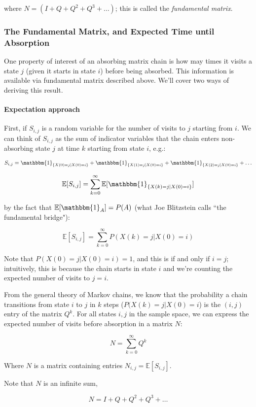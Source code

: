 \documentclass[11pt]{article}
\newcommand{\E}{\mathbb{E}}
\begin{document}
where $N = (I + Q + Q^2 + Q^3 + \ldots)$; this is called the \emph{fundamental
matrix}.


\subsubsection{The Fundamental Matrix, and Expected Time until Absorption}

One property of interest of an absorbing matrix chain is how may times it
visits a state $j$ (given it starts in state $i$) before being absorbed. This
information is available via fundamental matrix described above. We'll cover
two ways of deriving this result.

\paragraph{Expectation approach} First, if $S_{i,j}$ is a random variable for the number of visits to $j$
starting from $i$. We can think of $S_{i,j}$ as the sum of indicator variables
that the chain enters non-absorbing state $j$ at time $k$ starting from state
$i$, e.g.:

$$
S_{i,j} = \mathbbm{1}_{\{X(0) = j | X(0) = i\}} + \mathbbm{1}_{\{X(1) = j | X(0) = i\}} + \mathbbm{1}_{\{X(2) = j | X(0) = i\}} + \ldots
$$

$$
\E[S_{i,j}] = \sum_{k=0}^\infty \E[\mathbbm{1}_{\{X(k) = j | X(0) = i\}}]
$$

by the fact that $\E[\mathbbm{1}_A] = P(A)$ (what Joe Blitzstein calls ``the
fundamental bridge"):

$$
\E[S_{i,j}] = \sum_{k=0}^\infty P(X(k) = j | X(0) = i)
$$

Note that $P(X(0) = j | X(0) = i) = 1$, and this is if and only if $i = j$;
intuitively, this is because the chain starts in state $i$ and we're counting
the expected number of visits to $j=i$.

From the general theory of Markov chains, we know that the probability a chain
transitions from state $i$ to $j$ in $k$ steps ($P(X(k) = j | X(0) = i$) is the
  $(i, j)$ entry of the matrix $Q^k$. For all states $i, j$ in the sample
  space, we can express the expected number of visits before absorption in a
  matrix $N$:

$$
N = \sum_{k=0}^{\infty} Q^k
$$

Where $N$ is a matrix containing entries $N_{i,j} = \E[S_{i,j}]$.

Note that $N$ is an infinite sum,

$$
N = I + Q + Q^2 + Q^3 + \ldots
$$
\end{document}
